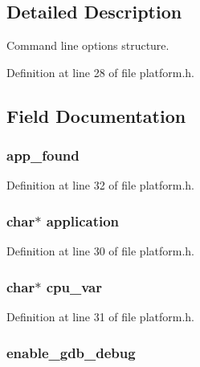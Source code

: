 \subsection{Detailed Description}
Command line options structure. 

Definition at line 28 of file platform.h.



\subsection{Field Documentation}
\hypertarget{struct____options_a733b31987044d50323e4f93e0afe9a8f}{
\subsubsection[{app\_\-found}]{ {\bf app\_\-found}}}
\label{struct____options_a733b31987044d50323e4f93e0afe9a8f}


Definition at line 32 of file platform.h.

\hypertarget{struct____options_a33c5b7a1a2460b52fd523966dd072eaa}{
\subsubsection[{application}]{\setlength{\rightskip}{0pt plus 5cm}char$\ast$ {\bf application}}}
\label{struct____options_a33c5b7a1a2460b52fd523966dd072eaa}


Definition at line 30 of file platform.h.

\hypertarget{struct____options_a149b98b6e5255adffe7c233f1041f10b}{
\subsubsection[{cpu\_\-var}]{\setlength{\rightskip}{0pt plus 5cm}char$\ast$ {\bf cpu\_\-var}}}
\label{struct____options_a149b98b6e5255adffe7c233f1041f10b}


Definition at line 31 of file platform.h.

\hypertarget{struct____options_a3d67a28c9bac416b79b31ed083589bdd}{
\subsubsection[{enable\_\-gdb\_\-debug}]{ {\bf enable\_\-gdb\_\-debug}}}
\label{struct____options_a3d67a28c9bac416b79b31ed083589bdd}


